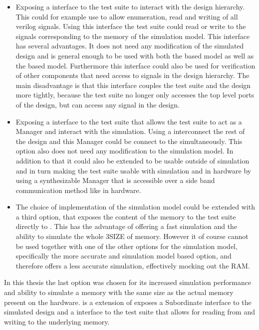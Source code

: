 \begin{itemize}
  \item Exposing a interface to the test suite to interact with the design hierarchy. This could for example use \VPI{} to allow enumeration, read and writing of all verilog signals. Using this interface the test suite could read or write to the signals corresponding to the memory of the \DRAM{} simulation model. This interface has several advantages. It does not need any modification of the simulated design and is general enough to be used with both the \AXIBRAMController{} based model as well as the \MIG{} based model. Furthermore this interface could also be used for verification of other components that need access to signals in the design hierarchy. The main disadvantage is that this interface couples the test suite and the \FPGA{} design more tightly, because the test suite no longer only accesses the top level ports of the design, but can access any signal in the \FPGA{} design.
  \item Exposing a interface to the test suite that allows the test suite to act as a \AXI{} Manager and interact with the simulation. Using a \AXI{} interconnect the rest of the \FPGA{} design and this \AXI{} Manager could be connect to the \AXI{} \DRAM{} simultaneously. This option also does not need any modification to the \AXI{} \DRAM{} simulation model. In addition to that it could also be extended to be usable outside of simulation and in turn making the test suite usable with simulation and in hardware by using a synthesizable \AXI{} Manager that is accessible over a side band communication method like \JTAG{} in hardware.
  \item The choice of implementation of the \AXI{} \DRAM{} simulation model could be extended with a third option, that exposes the content of the memory to the test suite directly to \flange{}. This has the advantage of offering a fast simulation and the ability to simulate the whole \DDR3SIZE{} of memory. However it of course cannot be used together with one of the other options for the \AXI{} \DRAM{} simulation model, specifically the more accurate \MIG{} and \DDR{} simulation model based option, and therefore offers a less accurate simulation, effectively mocking out the RAM.
\end{itemize}
In this thesis the last option was chosen for its increased simulation performance and ability to simulate a memory with the same size as the actual memory present on the hardware. \flangedram{} is a extension of \flange{} exposes a \AXI{} Subordinate interface to the simulated \FPGA{} design and a interface to the test suite that allows for reading from and writing to the underlying memory.

